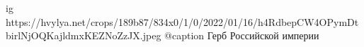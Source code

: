  
 
 
 
 

\ifcmt
  ig https://hvylya.net/crops/189b87/834x0/1/0/2022/01/16/h4RdbepCW4OPymDtbirlNjOQKajldmxKEZNoZzJX.jpeg
  @caption Герб Российской империи
\fi
